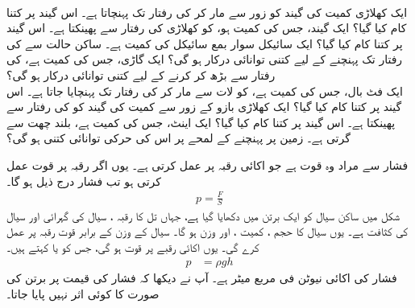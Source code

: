  \\
ایک کھلاڑی  کمیت کی   گیند کو زور سے  مار کر  کی رفتار تک پہنچاتا ہے۔ اس گیند پر کتنا کام کیا گیا؟ 
ایک گیند، جس کی کمیت  ہو، کو کھلاڑی  کی رفتار سے  پھینکتا ہے۔ اس گیند پر کتنا کام کیا گیا؟
ایک سائیکل سوار بمع سائیکل کی کمیت  ہے۔ ساکن حالت  سے  کی رفتار تک پہنچنے کے لیے کتنی توانائی درکار ہو گی؟
ایک گاڑی،  جس کی کمیت  ہے، کی رفتار  سے بڑھ کر  کرنے کے لیے کتنی توانائی درکار ہو گی؟
\\
ایک فٹ بال، جس کی کمیت  ہے، کو لات سے مار  کر  کی رفتار تک پہنچایا جاتا ہے۔ اس گیند پر کتنا کام کیا گیا؟
ایک کھلاڑی بازو کے زور سے  کمیت کی  گیند کو  کی رفتار سے پھینکتا ہے۔ اس گیند پر کتنا کام کیا گیا؟
ایک اینٹ،  جس کی کمیت  ہے،   بلند چھت سے گرتی ہے۔ زمین پر پہنچنے کے لمحے پر اس کی حرکی توانائی کتنی ہو گی؟




فشار  سے مراد وہ قوت ہے جو اکائی رقبہ پر عمل کرتی ہے۔ یوں اگر رقبہ  پر قوت  عمل کرتی ہو تب فشار  درج ذیل ہو گا۔
\begin{align}\label{مساوات_تکمل_استعمال_فشار_اور_قوت}
p=\frac{F}{S}
\end{align}
 شکل  میں ساکن سیال کو ایک برتن میں دکھایا گیا ہے، جہاں تل کا رقبہ ، سیال کی گہرائی  اور  سیال کی کثافت  ہے۔ یوں سیال کا حجم ،  کمیت ،  اور وزن  ہو گا۔ سیال کے وزن کے برابر قوت  رقبہ  پر عمل کرے گی۔ یوں اکائی رقبے  پر قوت  ہو گی،  جس کو   یا  کہتے ہیں۔
\begin{align}\label{مساوات_تکمل_استعمال_فشار_سیال_الف}
p&=\rho g h
\end{align}
فشار کی اکائی  نیوٹن فی مربع میٹر  ہے۔ آپ نے دیکھا کہ فشار  کی قیمت پر برتن کی صورت کا کوئی اثر نہیں پایا جاتا۔

